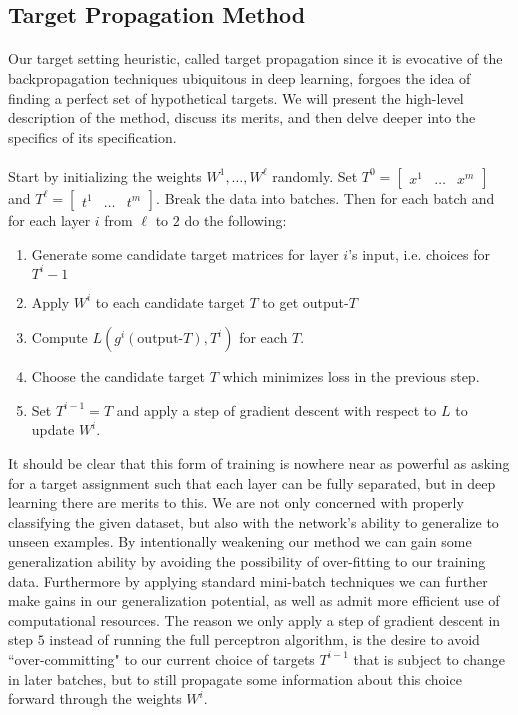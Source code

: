 \subsection{Target Propagation Method}

\paragraph{}
Our target setting heuristic, called target propagation since it is evocative of the backpropagation techniques ubiquitous in deep learning, forgoes the idea of finding a perfect set of hypothetical targets.  We will present the high-level description of the method, discuss its merits, and then delve deeper into the specifics of its specification.
\paragraph{}
Start by initializing the weights $W^1, \dots, W^\ell$ randomly. Set $T^0 = \begin{bmatrix}
x^1 & \dots & x^m
\end{bmatrix}$ and $T^\ell = \begin{bmatrix}
t^1 & \dots & t^m
\end{bmatrix}$. Break the data into batches. Then for each batch and for each layer $i$ from $\ell$ to $2$ do the following: 
\begin{enumerate}
	\item Generate some candidate target matrices for layer $i$'s input, i.e. choices for $T^i-1$
	\item Apply $W^i$ to each candidate target $T$ to get output-$T$
	\item Compute $L(g^i(\text{output-}T), T^i)$ for each $T$.
	\item Choose the candidate target $T$ which minimizes loss in the previous step.
	\item Set $T^{i-1} = T$ and apply a step of gradient descent with respect to $L$ to update $W^i$.
\end{enumerate}
It should be clear that this form of training is nowhere near as powerful as asking for a target assignment such that each layer can be fully separated, but in deep learning there are merits to this. We are not only concerned with properly classifying the given dataset, but also with the network's ability to generalize to unseen examples. By intentionally weakening our method we can gain some generalization ability by avoiding the possibility of over-fitting to our training data. Furthermore by applying standard mini-batch techniques \cite{lecun1998efficient, keskar2016large} we can further make gains in our generalization potential, as well as admit more efficient use of computational resources. The reason we only apply a step of gradient descent in step $5$ instead of running the full perceptron algorithm, is the desire to avoid ``over-committing" to our current choice of targets $T^{i-1}$ that is subject to change in later batches, but to still propagate some information about this choice forward through the weights $W^i$.

